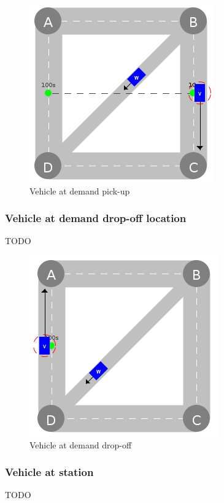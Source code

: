 \documentclass[graybox]{svmult}
\begin{document}
\begin{figure}[htbp]
	\centering
	\includegraphics[scale=0.5]{../../events/vehicle-at-demand-pick-up.png}
	\caption{Vehicle at demand pick-up}
	\label{fig:vehicle-at-demand-pick-up}
\end{figure}

\subsubsection{Vehicle at demand drop-off location}
TODO

\begin{figure}[htbp]
	\centering
	\includegraphics[scale=0.5]{../../events/vehicle-at-demand-drop-off.png}
	\caption{Vehicle at demand drop-off}
	\label{fig:vehicle-at-demand-drop-off}
\end{figure}

\subsubsection{Vehicle at station}
TODO
\end{document}
